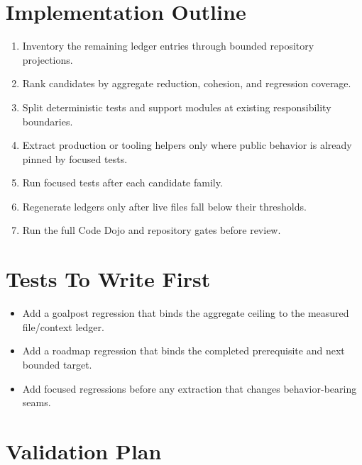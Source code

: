 \section{Implementation Outline}\label{record-245-implementation-outline}

\begin{enumerate}
\def\labelenumi{\arabic{enumi}.}
\tightlist
\item
  Inventory the remaining ledger entries through bounded repository projections.
\item
  Rank candidates by aggregate reduction, cohesion, and regression coverage.
\item
  Split deterministic tests and support modules at existing responsibility boundaries.
\item
  Extract production or tooling helpers only where public behavior is already pinned by focused tests.
\item
  Run focused tests after each candidate family.
\item
  Regenerate ledgers only after live files fall below their thresholds.
\item
  Run the full Code Dojo and repository gates before review.
\end{enumerate}

\section{Tests To Write First}\label{record-245-tests-to-write-first}

\begin{itemize}
\tightlist
\item
  Add a goalpost regression that binds the aggregate ceiling to the measured file/context ledger.
\item
  Add a roadmap regression that binds the completed prerequisite and next bounded target.
\item
  Add focused regressions before any extraction that changes behavior-bearing seams.
\end{itemize}

\section{Validation Plan}\label{record-245-validation-plan}

